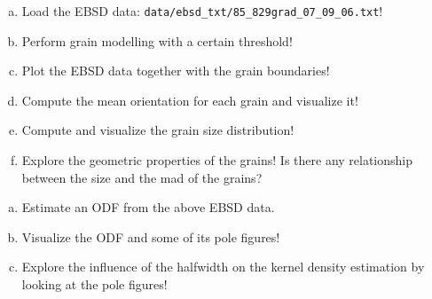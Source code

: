 \begin{frame}

  \begin{Exercise}
    \begin{enumerate}[a)]
    \item Load the EBSD data:
      \texttt{data/ebsd\_txt/85\_829grad\_07\_09\_06.txt}!
    \item Perform grain modelling with a certain threshold!
    \item Plot the EBSD data together with the grain boundaries!
    \item Compute the mean orientation for each grain and visualize it!
    \item Compute and visualize the grain size distribution!
    \item Explore the geometric properties of the grains! Is there any
      relationship between the size and the mad of the grains?
    \end{enumerate}
  \end{Exercise}

  \begin{Exercise}
    \begin{enumerate}[a)]
    \item Estimate an ODF from the above EBSD data.
    \item Visualize the ODF and some of its pole figures!
    \item Explore the influence of the halfwidth on the kernel
      density estimation by looking at the pole figures!
    \end{enumerate}
  \end{Exercise}


\end{frame}




